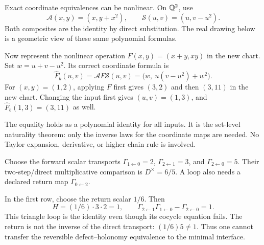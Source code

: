 Exact coordinate equivalences can be nonlinear. On $\mathbb Q^2$, use
\[
\mathcal A(x,y)=(x,y+x^2),\qquad
\mathcal S(u,v)=(u,v-u^2).
\]
Both composites are the identity by direct substitution. The real drawing below is a geometric view of these same polynomial formulas.


Now represent the nonlinear operation $F(x,y)=(x+y,xy)$ in the new chart. Set $w=u+v-u^2$. Its correct coordinate formula is
\[
\widehat F_b(u,v)=\mathcal A F\mathcal S(u,v)
=\bigl(w,\ u(v-u^2)+w^2\bigr).
\]
For $(x,y)=(1,2)$, applying $F$ first gives $(3,2)$ and then $(3,11)$ in the new chart. Changing the input first gives $(u,v)=(1,3)$, and $\widehat F_b(1,3)=(3,11)$ as well.

The equality holds as a polynomial identity for all inputs. It is the set-level naturality theorem: only the inverse laws for the coordinate maps are needed. No Taylor expansion, derivative, or higher chain rule is involved.


Choose the forward scalar transports $\Gamma_{1\leftarrow0}=2$, $\Gamma_{2\leftarrow1}=3$, and $\Gamma_{2\leftarrow0}=5$. Their two-step/direct multiplicative comparison is $D^\times=6/5$. A loop also needs a declared return map $\Gamma_{0\leftarrow2}$.


In the first row, choose the return scalar $1/6$. Then
\[
H=(1/6)\cdot3\cdot2=1,
\qquad \Gamma_{2\leftarrow1}\Gamma_{1\leftarrow0}-\Gamma_{2\leftarrow0}=1.
\]
This triangle loop is the identity even though its cocycle equation fails. The return is not the inverse of the direct transport: $(1/6)5\ne1$. Thus one cannot transfer the reversible defect--holonomy equivalence to the minimal interface.

